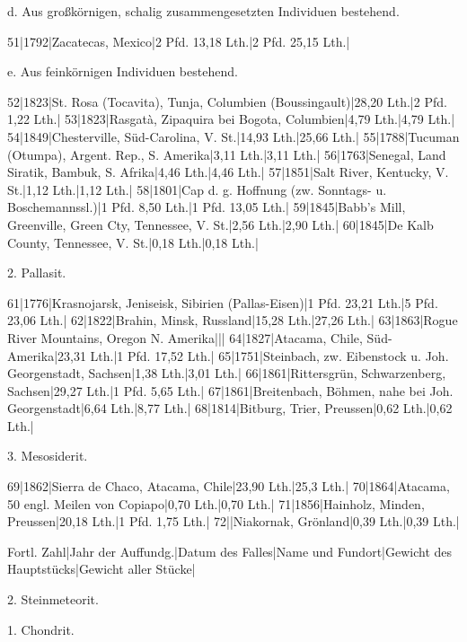 \documentclass[a4paper, 11pt, oneside]{article}
\begin{document}
d. Aus großkörnigen, schalig zusammengesetzten Individuen bestehend.  

51|1792|Zacatecas, Mexico|2 Pfd. 13,18 Lth.|2 Pfd. 25,15 Lth.|  

e. Aus feinkörnigen Individuen bestehend. 

52|1823|St. Rosa (Tocavita), Tunja, Columbien (Boussingault)|28,20 Lth.|2 Pfd. 1,22 Lth.|  
53|1823|Rasgatà, Zipaquira bei Bogota, Columbien|4,79 Lth.|4,79 Lth.|  
54|1849|Chesterville, Süd-Carolina, V. St.|14,93 Lth.|25,66 Lth.|  
55|1788|Tucuman (Otumpa), Argent. Rep., S. Amerika|3,11 Lth.|3,11 Lth.|  
56|1763|Senegal, Land Siratik, Bambuk, S. Afrika|4,46 Lth.|4,46 Lth.|  
57|1851|Salt River, Kentucky, V. St.|1,12 Lth.|1,12 Lth.|  
58|1801|Cap d. g. Hoffnung (zw. Sonntags- u. Boschemannssl.)|1 Pfd. 8,50 Lth.|1 Pfd. 13,05 Lth.|  
59|1845|Babb's Mill, Greenville, Green Cty, Tennessee, V. St.|2,56 Lth.|2,90 Lth.|  
60|1845|De Kalb County, Tennessee, V. St.|0,18 Lth.|0,18 Lth.|  

2. Pallasit.  

61|1776|Krasnojarsk, Jeniseisk, Sibirien (Pallas-Eisen)|1 Pfd. 23,21 Lth.|5 Pfd. 23,06 Lth.|  
62|1822|Brahin, Minsk, Russland|15,28 Lth.|27,26 Lth.|  
63|1863|Rogue River Mountains, Oregon N. Amerika|||  
64|1827|Atacama, Chile, Süd-Amerika|23,31 Lth.|1 Pfd. 17,52 Lth.|  
65|1751|Steinbach, zw. Eibenstock u. Joh. Georgenstadt, Sachsen|1,38 Lth.|3,01 Lth.|  
66|1861|Rittersgrün, Schwarzenberg, Sachsen|29,27 Lth.|1 Pfd. 5,65 Lth.|  
67|1861|Breitenbach, Böhmen, nahe bei Joh. Georgenstadt|6,64 Lth.|8,77 Lth.|  
68|1814|Bitburg, Trier, Preussen|0,62 Lth.|0,62 Lth.|  

3. Mesosiderit.  

69|1862|Sierra de Chaco, Atacama, Chile|23,90 Lth.|25,3 Lth.|  
70|1864|Atacama, 50 engl. Meilen von Copiapo|0,70 Lth.|0,70 Lth.|  
71|1856|Hainholz, Minden, Preussen|20,18 Lth.|1 Pfd. 1,75 Lth.|  
72||Niakornak, Grönland|0,39 Lth.|0,39 Lth.|  

Fortl. Zahl|Jahr der Auffundg.|Datum des Falles|Name und Fundort|Gewicht des Hauptstücks|Gewicht aller Stücke|

2. Steinmeteorit.  

1. Chondrit.  
\end{document}
